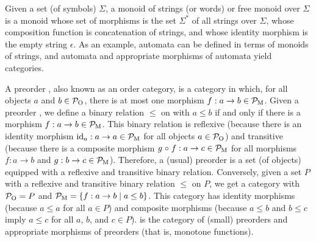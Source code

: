 \begin{example}


  \label{ex:monoid-strings}


  Given a set (of symbols) $\Sigma$, a monoid of strings (or words) or
  free monoid over $\Sigma$ is a monoid whose set of morphisms is the
  set $\Sigma^{*}$ of all strings over $\Sigma$, whose composition
  function is concatenation of strings, and whose identity morphism is
  the empty string $\epsilon$. As an example, automata can be defined
  in terms of monoids of strings, and automata and appropriate
  morphisms of automata yield categories.

\end{example}

\begin{example}
  [Preorders]


  \label{ex:preorder}


  A preorder , also known as an order category, is a category
  in which, for all objects $a$ and $b \in \mathcal{P}_{\operatorname{O}}$, there is at most
  one morphism $f: a \to b \in \mathcal{P}_{\operatorname{M}}$. Given a preorder , we
  define a binary relation $\leq$ on  with $a \leq b$ if and
  only if there is a morphism $f: a \to b \in \mathcal{P}_{\operatorname{M}}$. This binary
  relation is reflexive (because there is an identity morphism
  $\operatorname{id}_{a}: a \to a \in \mathcal{P}_{\operatorname{M}}$ for all objects $a \in \mathcal{P}_{\operatorname{O}}$)
  and transitive (because there is a composite morphism $g \mathrel{\circ} f: a
  \to c \in \mathcal{P}_{\operatorname{M}}$ for all morphisms $f: a \to b$ and $g: b \to c
  \in \mathcal{P}_{\operatorname{M}}$). Therefore, a (usual) preorder is a set (of objects)
  equipped with a reflexive and transitive binary relation.
  Conversely, given a set $P$ with a reflexive and transitive binary
  relation $\leq$ on $P$, we get a category  with $\mathcal{P}_{\operatorname{O}} =
  P$ and $\mathcal{P}_{\operatorname{M}} = \{f: a \to b \mid a \leq b\}$. This category has
  identity morphisms (because $a \leq a$ for all $a \in P$) and
  composite morphisms (because $a \leq b$ and $b \leq c$ imply $a \leq
  c$ for all $a$, $b$, and $c \in P$).  is the category of
  (small) preorders and appropriate morphisms of preorders (that is,
  monotone functions).

\end{example}

